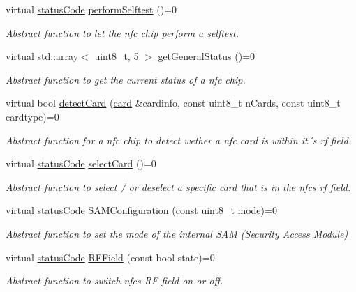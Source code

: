 \begin{DoxyCompactItemize}
virtual \hyperlink{declarations_8h_ae1d20c5a38cae82ccaa6a77be3fd264b}{status\+Code} \hyperlink{classnfc_1_1NFC_ac23474442d2bc8e35ee583c1390386eb}{perform\+Selftest} ()=0
\begin{DoxyCompactList}\small\item\em Abstract function to let the nfc chip perform a selftest. \end{DoxyCompactList}\item 
virtual std\+::array$<$ uint8\+\_\+t, 5 $>$ \hyperlink{classnfc_1_1NFC_a4ee83726542bf5f25eacb9feaccefd28}{get\+General\+Status} ()=0
\begin{DoxyCompactList}\small\item\em Abstract function to get the current status of a nfc chip. \end{DoxyCompactList}\item 
virtual bool \hyperlink{classnfc_1_1NFC_a72523a6c0afdb3f695a64e46fd6d2213}{detect\+Card} (\hyperlink{classcard}{card} \&cardinfo, const uint8\+\_\+t n\+Cards, const uint8\+\_\+t cardtype)=0
\begin{DoxyCompactList}\small\item\em Abstract function for a nfc chip to detect wether a nfc card is within it´s rf field. \end{DoxyCompactList}\item 
virtual \hyperlink{declarations_8h_ae1d20c5a38cae82ccaa6a77be3fd264b}{status\+Code} \hyperlink{classnfc_1_1NFC_a89a1275bc915581d708c65d487427317}{select\+Card} ()=0
\begin{DoxyCompactList}\small\item\em Abstract function to select / or deselect a specific card that is in the nfc\textquotesingle{}s rf field. \end{DoxyCompactList}\item 
virtual \hyperlink{declarations_8h_ae1d20c5a38cae82ccaa6a77be3fd264b}{status\+Code} \hyperlink{classnfc_1_1NFC_ab4dc91843bbd93211aa0f086e93b8608}{S\+A\+M\+Configuration} (const uint8\+\_\+t mode)=0
\begin{DoxyCompactList}\small\item\em Abstract function to set the mode of the internal S\+AM (Security Access Module) \end{DoxyCompactList}\item 
virtual \hyperlink{declarations_8h_ae1d20c5a38cae82ccaa6a77be3fd264b}{status\+Code} \hyperlink{classnfc_1_1NFC_a1179f5330aa9092aff8b1d6f984bc621}{R\+F\+Field} (const bool state)=0
\begin{DoxyCompactList}\small\item\em Abstract function to switch nfc\textquotesingle{}s RF field on or off. \end{DoxyCompactList}\item 

\end{DoxyCompactItemize}
